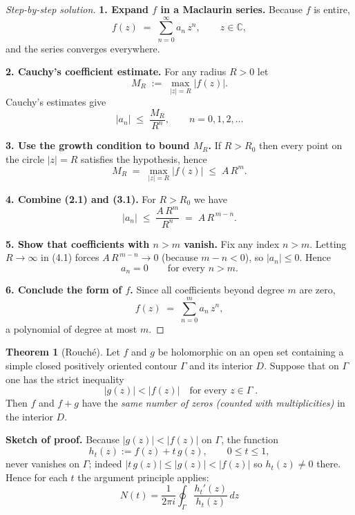 \documentclass[12pt]{article}
\theoremstyle{definition} %
\newtheorem{theorem}{Theorem}
\theoremstyle{plain} %
\begin{document}
  \begin{proof}[Step-by-step solution]
  \textbf{1.\; Expand \(f\) in a Maclaurin series.}  
  Because \(f\) is entire,
  \[
     f(z) \;=\; \sum_{n=0}^{\infty} a_{n}\,z^{n},
     \qquad z\in\mathbb{C},
  \]
  and the series converges everywhere.
  
  \bigskip
  \textbf{2.\; Cauchy’s coefficient estimate.}  
  For any radius \(R>0\) let
  \[
     M_{R} \;:=\;
     \max_{|z|=R} |f(z)|.
  \]
  Cauchy’s estimates give
  \[
     |a_{n}|
     \;\le\;
     \frac{M_{R}}{R^{n}},
     \qquad n=0,1,2,\dots
  \tag{2.1}
  \]
  
  \bigskip
  \textbf{3.\; Use the growth condition to bound \(M_{R}\).}  
  If \(R>R_{0}\) then every point on the circle \(|z|=R\) satisfies the
  hypothesis, hence
  \[
     M_{R} \;=\; \max_{|z|=R}|f(z)|
              \;\le\;
              A\,R^{m}.
  \tag{3.1}
  \]
  
  \bigskip
  \textbf{4.\; Combine (2.1) and (3.1).}  
  For \(R>R_{0}\) we have
  \[
     |a_{n}|
     \;\le\;
     \frac{A\,R^{m}}{R^{n}}
     \;=\;
     A\,R^{\,m-n}.
  \tag{4.1}
  \]
  
  \bigskip
  \textbf{5.\; Show that coefficients with \(n>m\) vanish.}  
  Fix any index \(n>m\).
  Letting \(R\to\infty\) in (4.1) forces
  \(A\,R^{\,m-n}\to0\) (because \(m-n<0\)), so
  \(|a_{n}|\le 0\).  Hence
  \[
     a_{n}=0
     \qquad\text{for every } n>m.
  \]
  
  \bigskip
  \textbf{6.\; Conclude the form of \(f\).}  
  Since all coefficients beyond degree \(m\) are zero,
  \[
     f(z)
     \;=\;
     \sum_{n=0}^{m} a_{n}\,z^{n},
  \]
  a polynomial of degree at most \(m\).
  \end{proof}
\begin{theorem}[Rouché]
  Let \(f\) and \(g\) be holomorphic on an open set containing a
  simple closed positively oriented contour \(\Gamma\)
  and its interior \(D\).
  Suppose that on \(\Gamma\) one has the strict inequality
  \[
    \boxed{\;|g(z)| < |f(z)|\quad\text{for every }z\in\Gamma\;.}
  \]
  Then \(f\) and \(f+g\) have the \emph{same number of zeros
  (counted with multiplicities)} in the interior \(D\).
  \end{theorem}
  
  \bigskip
  \noindent
  \textbf{Sketch of proof.}
  Because \(|g(z)|<|f(z)|\) on \(\Gamma\), the function
  \[
    h_t(z):=f(z)+t\,g(z),
    \qquad 0\le t\le1,
  \]
  never vanishes on \(\Gamma\); indeed
  \(|t\,g(z)|\le|g(z)|<|f(z)|\) so \(h_t(z)\neq0\) there.
  Hence for each \(t\) the argument principle applies:
  \[
    N(t)=\frac1{2\pi i}\oint_{\Gamma}\!
          \frac{h_t'(z)}{h_t(z)}\,dz
  \]
  
\end{document}
